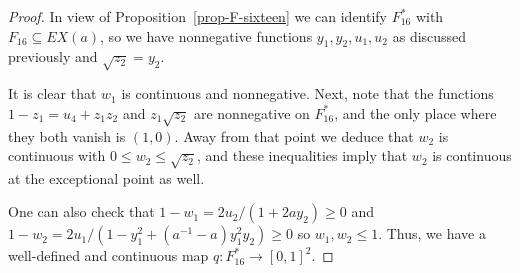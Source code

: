 \documentclass[reqno]{amsart}
\newcommand{\sse}       {\subseteq}
\renewcommand{\:}{\colon}
\theoremstyle{definition}
\begin{document}
\begin{proof}
 In view of Proposition~\ref{prop-F-sixteen} we can identify
 $F_{16}^*$ with $F_{16}\sse EX(a)$, so we have nonnegative functions
 $y_1,y_2,u_1,u_2$ as discussed previously and $\sqrt{z_2}=y_2$.

 It is clear that $w_1$ is continuous and nonnegative.  Next,
 note that the functions $1-z_1=u_4+z_1z_2$ and $z_1\sqrt{z_2}$ are
 nonnegative on $F_{16}^*$, and the only place where they both vanish
 is $(1,0)$.  Away from that point we deduce that $w_2$ is continuous
 with $0\leq w_2\leq\sqrt{z_2}$, and these inequalities imply that
 $w_2$ is continuous at the exceptional point as well.

 One can also check that $1-w_1=2u_2/(1+2ay_2)\geq 0$ and
 $1-w_2=2u_1/(1-y_1^2+(a^{-1}-a)y_1^2y_2)\geq 0$ so
 $w_1,w_2\leq 1$.  Thus, we have a well-defined and continuous map
 $q\:F_{16}^*\to [0,1]^2$.


\end{proof}
\end{document}
